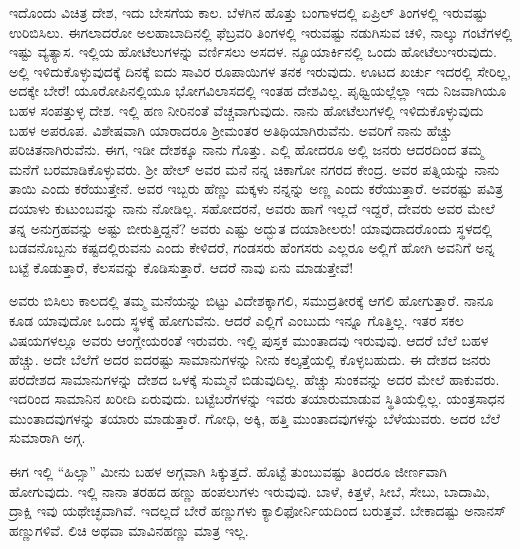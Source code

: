ಇದೊಂದು ವಿಚಿತ್ರ ದೇಶ, ಇದು ಬೇಸಗೆಯ ಕಾಲ. ಬೆಳಗಿನ ಹೊತ್ತು ಬಂಗಾಳದಲ್ಲಿ ಏಪ್ರಿಲ್ ತಿಂಗಳಲ್ಲಿ ಇರುವಷ್ಟು ಉರಿಬಿಸಿಲು. ಈಗಲಾದರೋ ಅಲಹಾಬಾದಿನಲ್ಲಿ ಫೆಬ್ರವರಿ ತಿಂಗಳಲ್ಲಿ ಇರುವಷ್ಟು ನಡುಗಿಸುವ ಚಳಿ, ನಾಲ್ಕು ಗಂಟೆಗಳಲ್ಲಿ ಇಷ್ಟು ವ್ಯತ್ಯಾಸ. ಇಲ್ಲಿಯ ಹೋಟೆಲುಗಳನ್ನು ವರ್ಣಿಸಲು ಅಸದಳ. ನ್ಯೂಯಾರ್ಕಿನಲ್ಲಿ ಒಂದು ಹೋಟೆಲು\break  ಇರುವುದು. ಅಲ್ಲಿ ಇಳಿದುಕೊಳ್ಳುವುದಕ್ಕೆ ದಿನಕ್ಕೆ ಐದು ಸಾವಿರ ರೂಪಾಯಿಗಳ ತನಕ ಇರುವುದು. ಊಟದ ಖರ್ಚು ಇದರಲ್ಲಿ ಸೇರಿಲ್ಲ, ಅದಕ್ಕೇ ಬೇರೆ! ಯೂರೋಪಿನಲ್ಲಿಯೂ ಭೋಗವಿಲಾಸದಲ್ಲಿ ಇಂತಹ ದೇಶವಿಲ್ಲ. ಪೃಥ್ವಿಯಲ್ಲೆಲ್ಲಾ ಇದು ನಿಜವಾಗಿಯೂ ಬಹಳ ಸಂಪತ್ತುಳ್ಳ ದೇಶ. ಇಲ್ಲಿ ಹಣ ನೀರಿನಂತೆ ವೆಚ್ಚವಾಗುವುದು. ನಾನು ಹೋಟೆಲುಗಳಲ್ಲಿ ಇಳಿದುಕೊಳ್ಳುವುದು ಬಹಳ ಅಪರೂಪ. ವಿಶೇಷವಾಗಿ ಯಾರಾದರೂ ಶ‍್ರೀಮಂತರ ಅತಿಥಿಯಾಗಿರುವೆನು. ಅವರಿಗೆ ನಾನು ಹೆಚ್ಚು ಪರಿಚಿತನಾಗಿರುವೆನು. ಈಗ, ಇಡೀ ದೇಶಕ್ಕೂ ನಾನು ಗೊತ್ತು. ಎಲ್ಲಿ ಹೋದರೂ ಅಲ್ಲಿ ಜನರು ಆದರದಿಂದ ತಮ್ಮ ಮನೆಗೆ ಬರಮಾಡಿಕೊಳ್ಳುವರು. ಶ‍್ರೀ ಹೇಲ್ ಅವರ ಮನೆ ನನ್ನ ಚಿಕಾಗೋ ನಗರದ ಕೇಂದ್ರ. ಅವರ ಪತ್ನಿಯನ್ನು ನಾನು ತಾಯಿ ಎಂದು ಕರೆಯುತ್ತೇನೆ. ಅವರ ಇಬ್ಬರು ಹೆಣ್ಣು ಮಕ್ಕಳು ನನ್ನನ್ನು ಅಣ್ಣ ಎಂದು ಕರೆಯುತ್ತಾರೆ. ಅವರಷ್ಟು ಪವಿತ್ರ ದಯಾಳು ಕುಟುಂಬವನ್ನು ನಾನು ನೋಡಿಲ್ಲ. ಸಹೋದರನೆ, ಅವರು ಹಾಗೆ ಇಲ್ಲದೆ ಇದ್ದರೆ, ದೇವರು ಅವರ ಮೇಲೆ ತನ್ನ ಅನುಗ್ರಹವನ್ನು ಅಷ್ಟು ಬೀರುತ್ತಿದ್ದನೆ? ಅವರು ಎಷ್ಟು ಅದ್ಭುತ ದಯಾಶೀಲರು! ಯಾವುದಾದರೊಂದು ಸ್ಥಳದಲ್ಲಿ ಬಡವನೊಬ್ಬನು ಕಷ್ಟದಲ್ಲಿರುವನು ಎಂದು ಕೇಳಿದರೆ, ಗಂಡಸರು ಹೆಂಗಸರು ಎಲ್ಲರೂ ಅಲ್ಲಿಗೆ ಹೋಗಿ ಅವನಿಗೆ ಅನ್ನ ಬಟ್ಟೆ ಕೊಡುತ್ತಾರೆ, ಕೆಲಸವನ್ನು ಕೊಡಿಸುತ್ತಾರೆ. ಆದರೆ ನಾವು ಏನು ಮಾಡುತ್ತೇವೆ!
\vspace{0.2cm}

ಅವರು ಬಿಸಿಲು ಕಾಲದಲ್ಲಿ ತಮ್ಮ ಮನೆಯನ್ನು ಬಿಟ್ಟು ವಿದೇಶಕ್ಕಾಗಲಿ, ಸಮುದ್ರತೀರಕ್ಕೆ ಆಗಲಿ ಹೋಗುತ್ತಾರೆ. ನಾನೂ ಕೂಡ ಯಾವುದೋ ಒಂದು ಸ್ಥಳಕ್ಕೆ ಹೋಗುವೆನು. ಆದರೆ ಎಲ್ಲಿಗೆ ಎಂಬುದು ಇನ್ನೂ ಗೊತ್ತಿಲ್ಲ. ಇತರ ಸಕಲ ವಿಷಯಗಳಲ್ಲೂ ಅವರು ಆಂಗ್ಲೇಯರಂತೆ ಇರುವರು. ಇಲ್ಲಿ ಪುಸ್ತಕ ಮುಂತಾದವು ಇರುವುವು. ಆದರೆ ಬೆಲೆ ಬಹಳ ಹೆಚ್ಚು. ಅದೇ ಬೆಲೆಗೆ ಅದರ ಐದರಷ್ಟು ಸಾಮಾನುಗಳನ್ನು ನೀನು ಕಲ್ಕತ್ತೆಯಲ್ಲಿ ಕೊಳ್ಳಬಹುದು. ಈ ದೇಶದ ಜನರು ಪರದೇಶದ ಸಾಮಾನುಗಳನ್ನು ದೇಶದ ಒಳಕ್ಕೆ ಸುಮ್ಮನೆ ಬಿಡುವುದಿಲ್ಲ. ಹೆಚ್ಚು ಸುಂಕವನ್ನು ಅದರ ಮೇಲೆ ಹಾಕುವರು. ಇದರಿಂದ ಸಾಮಾನಿನ ಖರೀದಿ ಏರುವುದು. ಬಟ್ಟೆಬರೆಗಳನ್ನು ಇವರು ತಯಾರುಮಾಡುವ ಸ್ಥಿತಿಯಲ್ಲಿಲ್ಲ. ಯಂತ್ರಸಾಧನ ಮುಂತಾದವುಗಳನ್ನು ತಯಾರು ಮಾಡುತ್ತಾರೆ. ಗೋಧಿ, ಅಕ್ಕಿ, ಹತ್ತಿ ಮುಂತಾದವುಗಳನ್ನು ಬೆಳೆಯುವರು. ಅದರ ಬೆಲೆ ಸುಮಾರಾಗಿ ಅಗ್ಗ.
\vspace{0.2cm}

ಈಗ ಇಲ್ಲಿ “ಹಿಲ್ಸಾ” ಮೀನು ಬಹಳ ಅಗ್ಗವಾಗಿ ಸಿಕ್ಕುತ್ತದೆ. ಹೊಟ್ಟೆ ತುಂಬುವಷ್ಟು ತಿಂದರೂ ಜೀರ್ಣವಾಗಿ ಹೋಗುವುದು. ಇಲ್ಲಿ ನಾನಾ ತರಹದ ಹಣ್ಣು ಹಂಪಲುಗಳು ಇರುವುವು. ಬಾಳೆ, ಕಿತ್ತಳೆ, ಸೀಬೆ, ಸೇಬು, ಬಾದಾಮಿ, ದ್ರಾಕ್ಷಿ ಇವು ಯಥೇಚ್ಛವಾಗಿವೆ. ಇದಲ್ಲದೆ ಬೇರೆ ಹಣ್ಣುಗಳು ಕ್ಯಾಲಿಫೋರ್ನಿಯದಿಂದ ಬರುತ್ತವೆ. ಬೇಕಾದಷ್ಟು ಅನಾನಸ್ ಹಣ್ಣುಗಳಿವೆ. ಲಿಚಿ ಅಥವಾ ಮಾವಿನಹಣ್ಣು ಮಾತ್ರ ಇಲ್ಲ.

